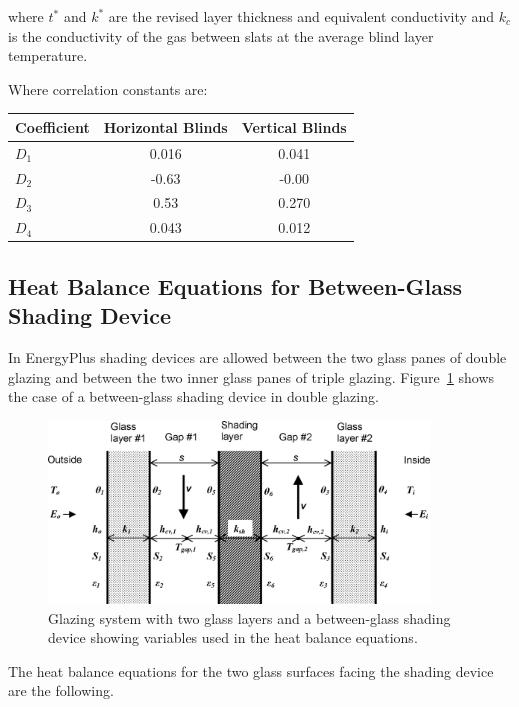 where $t^*$ and $k^*$ are the revised layer thickness and equivalent conductivity and $k_c$ is the conductivity of the gas between slats at the average blind layer temperature.

Where correlation constants are:

\begin{tabular}{ l c c }
	\hline	
	Coefficient & Horizontal Blinds & Vertical Blinds \\
	\hline
	\hline
	$D_1$ & 0.016 & 0.041 \\
	$D_2$ & -0.63 & -0.00 \\
	$D_3$ & 0.53 & 0.270 \\
	$D_4$ & 0.043 & 0.012 \\
	\hline  
	
\end{tabular}

\subsection{Heat Balance Equations for Between-Glass Shading Device}\label{heat-balance-equations-for-between-glass-shading-device}

In EnergyPlus shading devices are allowed between the two glass panes of double glazing and between the two inner glass panes of triple glazing. Figure~\ref{fig:glazing-system-with-two-glass-layers-and-a} shows the case of a between-glass shading device in double glazing.

\begin{figure}[hbtp] %
\centering
\includegraphics[width=0.9\textwidth, height=0.9\textheight, keepaspectratio=true]{media/image1691.png}
\caption{Glazing system with two glass layers and a between-glass shading device showing variables used in the heat balance equations. \protect \label{fig:glazing-system-with-two-glass-layers-and-a}}
\end{figure}

The heat balance equations for the two glass surfaces facing the shading device are the following.

